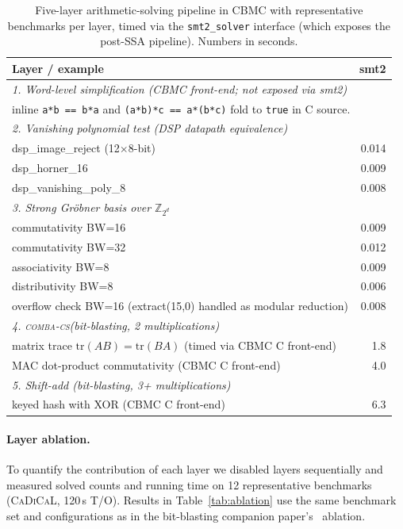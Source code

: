 \documentclass[runningheads]{llncs}
\newcommand{\combacs}{\textsc{comba-cs}\xspace}
\newcommand{\cadical}{\textsc{CaDiCaL}\xspace}
\newcommand{\cbmc}{\textsc{CBMC}\xspace}
\begin{document}
\begin{table}[ht]
\caption{Five-layer arithmetic-solving pipeline in \cbmc with
  representative benchmarks per layer, timed via the
  \texttt{smt2\_solver} interface (which exposes the post-SSA
  pipeline). Numbers in seconds.}
\label{tab:wordlevel}
\centering
\small
\begin{tabular}{lr}
\toprule
Layer / example & smt2 \\
\midrule
\multicolumn{2}{l}{\emph{1. Word-level simplification (CBMC front-end; not exposed via smt2)}} \\
\multicolumn{2}{l}{\quad inline \texttt{a*b == b*a} and \texttt{(a*b)*c == a*(b*c)} fold to \texttt{true} in C source.} \\
\midrule
\multicolumn{2}{l}{\emph{2. Vanishing polynomial test (DSP datapath equivalence)}} \\
\quad dsp\_image\_reject (12$\times$8-bit) & 0.014 \\
\quad dsp\_horner\_16 & 0.009 \\
\quad dsp\_vanishing\_poly\_8 & 0.008 \\
\midrule
\multicolumn{2}{l}{\emph{3. Strong Gr\"obner basis over $\mathbb{Z}_{2^d}$}} \\
\quad commutativity BW=16 & 0.009 \\
\quad commutativity BW=32 & 0.012 \\
\quad associativity BW=8 & 0.009 \\
\quad distributivity BW=8 & 0.006 \\
\quad overflow check BW=16 (extract(15,0) handled as modular reduction) & 0.008 \\
\midrule
\multicolumn{2}{l}{\emph{4. \combacs (bit-blasting, 2 multiplications)}} \\
\quad matrix trace $\mathrm{tr}(AB) = \mathrm{tr}(BA)$ (timed via CBMC C front-end) & 1.8 \\
\quad MAC dot-product commutativity (CBMC C front-end) & 4.0 \\
\midrule
\multicolumn{2}{l}{\emph{5. Shift-add (bit-blasting, 3+ multiplications)}} \\
\quad keyed hash with XOR (CBMC C front-end) & 6.3 \\
\bottomrule
\end{tabular}
\end{table}

\paragraph{Layer ablation.}
To quantify the contribution of each layer we disabled layers
sequentially and measured solved counts and running time on 12
representative benchmarks (\cadical, 120\,s T/O). Results in
Table~\ref{tab:ablation} use the same benchmark set and
configurations as in the bit-blasting companion
paper's~\cite{companion-bitblasting} ablation.
\end{document}
